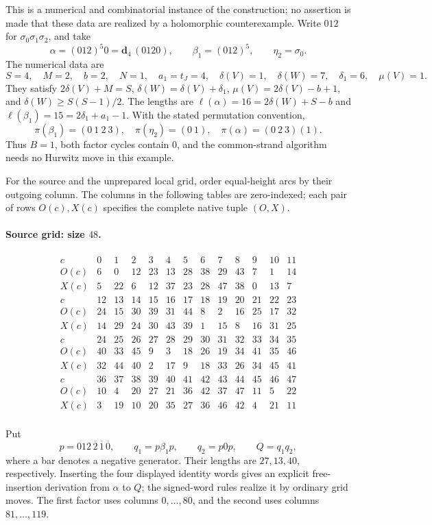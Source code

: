\documentclass[11pt,a4paper]{article}
\theoremstyle{remark}
\begin{document}
This is a numerical and combinatorial instance of the construction;
no assertion is made that these data are realized by a holomorphic
counterexample.  Write $012$ for $\sigma_0\sigma_1\sigma_2$, and take
\[
 \alpha=(012)^5 0=\mathbf d_4\,(0120),\qquad
 \beta_1=(012)^5,\qquad \eta_2=\sigma_0.
\]
The numerical data are
\[
 S=4,\quad M=2,\quad b=2,\quad N=1,\quad a_1=t_J=4,
 \quad \delta(V)=1,\quad \delta(W)=7,\quad\delta_1=6,
 \quad\mu(V)=1.
\]
They satisfy $2\delta(V)+M=S$, $\delta(W)=\delta(V)+\delta_1$,
$\mu(V)=2\delta(V)-b+1$, and $\delta(W)\ge S(S-1)/2$.
The lengths are $\ell(\alpha)=16=2\delta(W)+S-b$ and
$\ell(\beta_1)=15=2\delta_1+a_1-1$.  With the stated permutation
convention,
\[
 \pi(\beta_1)=(0\ 1\ 2\ 3),\quad
 \pi(\eta_2)=(0\ 1),\quad
 \pi(\alpha)=(0\ 2\ 3)(1).
\]
Thus $B=1$, both factor cycles contain $0$, and the common-strand
algorithm needs no Hurwitz move in this example.

For the source and the unprepared local grid, order equal-height arcs
by their outgoing column.  The columns in the following tables are
zero-indexed; each pair of rows $O(c),X(c)$ specifies the complete
native tuple $(O,X)$.

\paragraph{Source grid: size $48$.}\mbox{}
\[
\begin{array}{c|rrrrrrrrrrrr}
c&0&1&2&3&4&5&6&7&8&9&10&11\\
O(c)&6&0&12&23&13&28&38&29&43&7&1&14\\
X(c)&5&22&6&12&37&23&28&47&38&0&13&7\\
\hline
c&12&13&14&15&16&17&18&19&20&21&22&23\\
O(c)&24&15&30&39&31&44&8&2&16&25&17&32\\
X(c)&14&29&24&30&43&39&1&15&8&16&31&25\\
\hline
c&24&25&26&27&28&29&30&31&32&33&34&35\\
O(c)&40&33&45&9&3&18&26&19&34&41&35&46\\
X(c)&32&44&40&2&17&9&18&33&26&34&45&41\\
\hline
c&36&37&38&39&40&41&42&43&44&45&46&47\\
O(c)&10&4&20&27&21&36&42&37&47&11&5&22\\
X(c)&3&19&10&20&35&27&36&46&42&4&21&11\\
\end{array}
\]

Put
\[
 p=012\,\overline2\,\overline1\,\overline0,
 \qquad q_1=p\beta_1p,\qquad q_2=p0p,\qquad Q=q_1q_2,
\]
where a bar denotes a negative generator.  Their lengths are
$27,13,40$, respectively.  Inserting the four displayed identity
words gives an explicit free-insertion derivation from $\alpha$ to
$Q$; the signed-word rules realize it by ordinary grid moves.
The first factor uses columns $0,\ldots,80$, and the second uses
columns $81,\ldots,119$.
\end{document}
